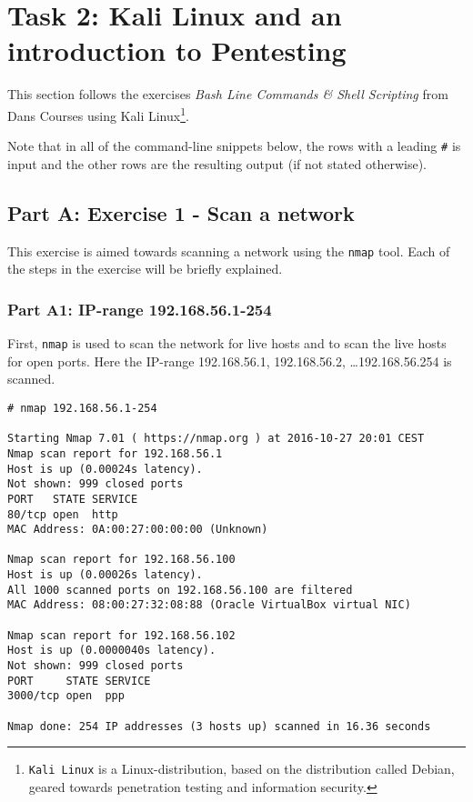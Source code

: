 \section{Task 2: Kali Linux and an introduction to Pentesting}
This section follows the exercises \textit{Bash Line Commands \& Shell
  Scripting} from Dans Courses\cite{DANSCOURSES} using Kali Linux\footnote{
  \texttt{Kali Linux} is a Linux-distribution, based on the distribution
called Debian\cite{KALIDEBIAN}, geared towards penetration testing and
information security.
}.

Note that in all of the command-line snippets below, the rows with
a leading \texttt{\#} is input and the other rows are the resulting
output (if not stated otherwise).

\subsection{Part A: Exercise 1 - Scan a network}
This exercise is aimed towards scanning a network using the
\texttt{nmap} tool. Each of the steps in the exercise will
be briefly explained.

\subsubsection{Part A1: IP-range 192.168.56.1-254}
\label{sec:parta1}
First, \texttt{nmap} is used to scan the network for live
hosts and to scan the live hosts for open ports. Here
the IP-range 192.168.56.1, 192.168.56.2, \dots 192.168.56.254
is scanned.

\begin{lstlisting}[numbers=none, language={}, frame=single, framexleftmargin={0.2em}]
# nmap 192.168.56.1-254

Starting Nmap 7.01 ( https://nmap.org ) at 2016-10-27 20:01 CEST
Nmap scan report for 192.168.56.1
Host is up (0.00024s latency).
Not shown: 999 closed ports
PORT   STATE SERVICE
80/tcp open  http
MAC Address: 0A:00:27:00:00:00 (Unknown)

Nmap scan report for 192.168.56.100
Host is up (0.00026s latency).
All 1000 scanned ports on 192.168.56.100 are filtered
MAC Address: 08:00:27:32:08:88 (Oracle VirtualBox virtual NIC)

Nmap scan report for 192.168.56.102
Host is up (0.0000040s latency).
Not shown: 999 closed ports
PORT     STATE SERVICE
3000/tcp open  ppp

Nmap done: 254 IP addresses (3 hosts up) scanned in 16.36 seconds
\end{lstlisting}

